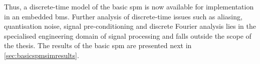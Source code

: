 Thus,  a  discrete-time model  of  the  basic  \gls{spm}  is now  available  for
implementation  in  an embedded  \gls{bms}.  Further  analysis of  discrete-time
issues  such  as  aliasing,  quantisation  noise,  signal  pre-conditioning  and
discrete Fourier analysis  lies in the specialised engineering  domain of signal
processing and falls outside  the scope of the thesis. The  results of the basic
\gls{spm} are presented next in \cref{sec:basicspmsimresults}.







